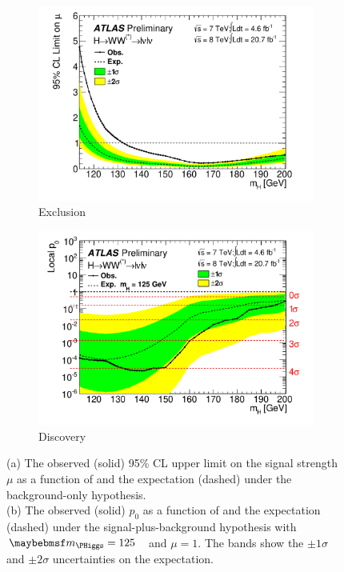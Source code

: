 \begin{figure}[t]
	\begin{subfigure}[b]{0.495\textwidth}
		\centering
		\includegraphics[width=\textwidth]{tex/results/Mor13_CLs}
		\caption{Exclusion}
		\label{fig:results:CLs}
	\end{subfigure}
	\hfill
	\begin{subfigure}[b]{0.495\textwidth}
		\centering
		\includegraphics[width=\textwidth]{tex/results/Mor13_p0}
		\caption{Discovery}
		\label{fig:results:p0}
	\end{subfigure}
	\caption{(a) The observed (solid) 95\% CL upper limit on the signal strength $\mu$ as a 
	function of \mH and the expectation (dashed) under the background-only hypothesis. \\
	(b) The observed (solid) $p_0$ as a function of \mH and the expectation (dashed) under 
	the signal-plus-background hypothesis with \unit{$\mH = 125$}{\GeV} and $\mu = 1$.
	The bands show the $\pm1\sigma$ and $\pm2\sigma$ uncertainties on the expectation.}
\end{figure}

